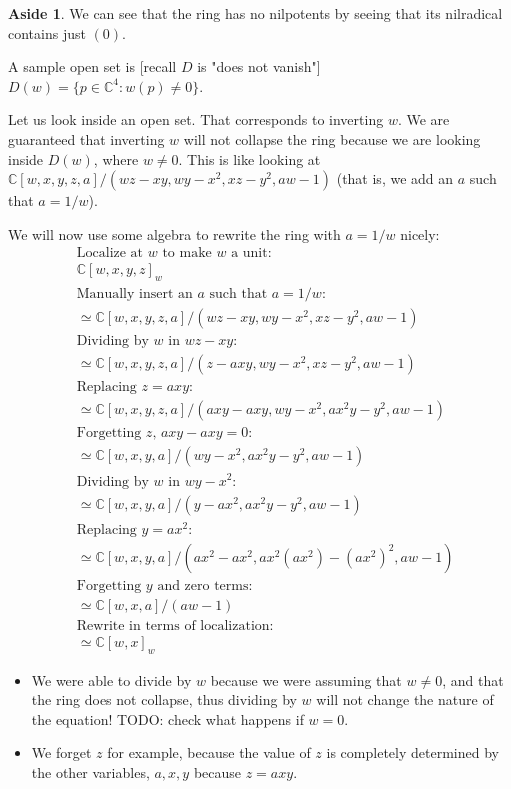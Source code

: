 \documentclass{book}
\newcommand{\C}{\ensuremath{\mathbb{C}}}
\theoremstyle{definition}
\newtheorem{aside}[theorem]{Aside}
\begin{document}
\begin{aside}
We can see that the ring has no nilpotents by seeing that its nilradical
contains just $(0)$.
\end{aside}

A sample open set is [recall $D$ is "does not vanish"]
$D(w) = \{ p \in \C^4: w(p) \neq 0 \}$.

Let us look inside an open set. That corresponds to inverting $w$. We are 
guaranteed that inverting $w$ will not collapse the ring because we are
looking inside $D(w)$, where $w \neq 0$. This is like looking at
$\C[w, x, y, z, a]/(wz - xy, wy - x^2, xz - y^2, aw - 1)$ (that is, we
add an $a$ such that $a = 1/w$).

We will now use some algebra to rewrite the ring with $a = 1/w$ nicely:
\begin{align*}
&\text{Localize at $w$ to make $w$ a unit:} \\
&\C[w, x, y, z]_w \\
&\text{Manually insert an $a$ such that $a = 1/w$:} \\
&\simeq \C[w, x, y, z, a]/(wz - xy, wy - x^2, xz - y^2, aw - 1) \\
&\text{Dividing by $w$ in $wz - xy$:} \\
&\simeq \C[w, x, y, z, a]/(z - axy, wy-x^2, xz - y^2, aw -1)  \\
&\text{Replacing $z = axy$:} \\
&\simeq \C[w, x, y, z, a]/(axy - axy, wy-x^2, ax^2 y - y^2, aw -1)  \\
&\text{Forgetting $z$, $axy - axy = 0$:} \\
&\simeq \C[w, x, y, a]/(wy-x^2, ax^2 y - y^2, aw -1)  \\
&\text{Dividing by $w$ in $wy - x^2$:} \\
&\simeq \C[w, x, y, a]/(y-ax^2, ax^2 y - y^2, aw -1)  \\
&\text{Replacing $y = ax^2$:} \\
&\simeq \C[w, x, y, a]/(ax^2-ax^2, ax^2 (ax^2) - (ax^2)^2, aw -1)  \\
&\text{Forgetting $y$ and zero terms:} \\
&\simeq \C[w, x, a]/(aw -1)  \\
&\text{Rewrite in terms of localization:} \\
&\simeq \C[w, x]_w
\end{align*} 


\begin{itemize}
\item We were able to divide by $w$ because we were assuming that $w \neq 0$,
      and that the ring does not collapse, thus dividing by $w$ will not
      change the nature of the equation! TODO: check what happens if
      $w = 0$.
\item We forget $z$ for example, because the value of $z$ is completely 
      determined by the other variables, $a, x, y$ because $z = axy$.
\end{itemize}
\end{document}
